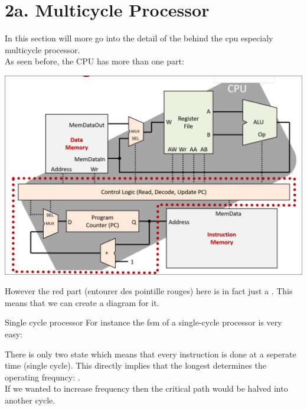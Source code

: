 \section{2a. Multicycle Processor}
In this section will more go into the detail of the  behind the cpu especialy multicycle processor.\\
As seen before, the CPU has more than one part:
\begin{center}
\includegraphics[scale=0.2]{screenshots/2025-10-21_5.png}
\end{center}
However the red part (entourer des pointille rouges) here is in fact just a . This means that we can create a diagram for it.
\begin{parag}{Single cycle processor} For instance the fsm of a single-cycle processor is very easy: 
\begin{center}
	    
	
\end{center}
There is only two state which means that every instruction is done at a seperate time (single cycle). This directly implies that the longest  determines the operating frequncy: .\\
If we wanted to increase frequency then the critical path would be halved into another cycle.
\end{parag}
